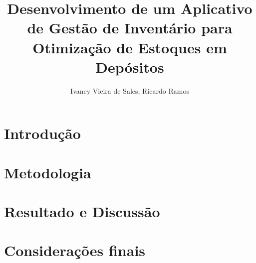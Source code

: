 \documentclass[12pt]{article}
\title{Desenvolvimento de um Aplicativo de Gestão de Inventário para Otimização de Estoques em Depósitos}
\author{Ivaney Vieira de Sales\inst{1}, Ricardo Ramos\inst{2}}
\begin{document}
 

\maketitle

\begin{resumo}

  
  
\end{resumo}

\begin{abstract}

  

\end{abstract}

\section{Introdução}



\section{Metodologia}



\section{Resultado e Discussão}



\section{Considerações finais}






\end{document}
